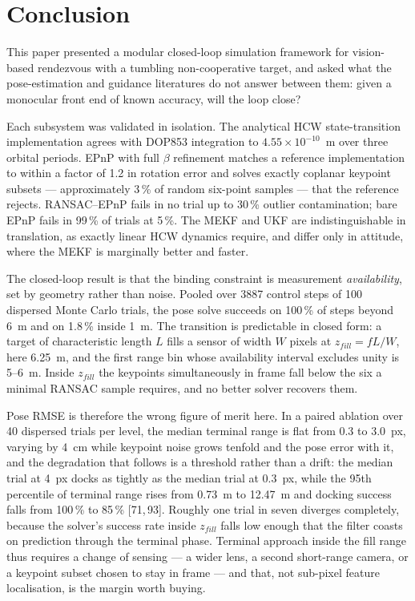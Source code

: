 \section{Conclusion}

This paper presented a modular closed-loop simulation framework for
vision-based rendezvous with a tumbling non-cooperative target, and asked what the pose-estimation and guidance literatures do not answer
between them: given a monocular front end of known accuracy, will the loop
close?

Each subsystem was validated in isolation. The analytical HCW
state-transition implementation agrees with DOP853 integration to
$4.55\times10^{-10}$~m over three orbital periods. EPnP with full $\beta$
refinement matches a reference implementation to within a factor of 1.2 in
rotation error and solves exactly coplanar keypoint subsets --- approximately
3\,\% of random six-point samples --- that the reference rejects. RANSAC--EPnP
fails in no trial up to 30\,\% outlier contamination; bare EPnP fails in
99\,\% of trials at 5\,\%. The MEKF and UKF are indistinguishable in
translation, as exactly linear HCW dynamics require, and differ only in
attitude, where the MEKF is marginally better and faster.

The closed-loop result is that the binding constraint is measurement
\emph{availability}, set by geometry rather than noise. Pooled over 3887
control steps of 100 dispersed Monte Carlo trials, the pose solve succeeds on
100\,\% of steps beyond 6~m and on 1.8\,\% inside 1~m. The transition is
predictable in closed form: a target of characteristic length $L$ fills a sensor
of width $W$ pixels at $z_{fill} = fL/W$, here 6.25~m, and the first range bin
whose availability interval excludes unity is 5--6~m. Inside $z_{fill}$ the
keypoints simultaneously in frame fall below the six a minimal RANSAC sample
requires, and no better solver recovers them.

Pose RMSE is therefore the wrong figure of merit here. In a paired ablation
over 40 dispersed trials per level, the median terminal range is flat from 0.3
to 3.0~px, varying by 4~cm while keypoint noise grows tenfold and the pose error
with it, and the degradation that follows is a threshold rather than a drift:
the median trial at 4~px docks as tightly as the median trial at 0.3~px, while
the 95th percentile of terminal range rises from 0.73~m to 12.47~m and docking
success falls from 100\,\% to 85\,\% [71,\,93]. Roughly one trial in seven
diverges completely, because the solver's success rate inside $z_{fill}$ falls
low enough that the filter coasts on prediction through the terminal phase.
Terminal approach inside the fill range thus requires a change of sensing --- a
wider lens, a second short-range camera, or a keypoint subset chosen to stay in
frame --- and that, not sub-pixel feature localisation, is the margin worth
buying.

